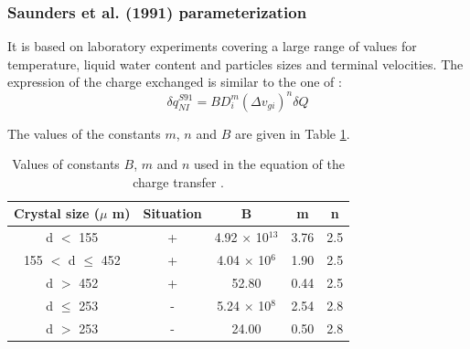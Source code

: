 \subsubsection{Saunders et al. (1991) parameterization}

It is based on laboratory experiments covering a large range of values for temperature, liquid water content and particles sizes and terminal velocities.
The expression of the charge exchanged is similar to the one of \citet{Gardiner-1985}:
\begin{equation}
  \delta q_{NI} ^{S91} = B D_i ^m (\Delta v_{gi})^n \delta Q
\end{equation}

\noindent
The values of the constants $m$, $n$ and $B$ are given in Table \ref{tab:param_saund}.
\begin{table}[h]
  \begin{center}
  \begin{tabular}{|c|c|c|c|c|}
    \hline
    Crystal size ($\mu$ m) & Situation & B & m & n \\
    \hline
    d $<$ 155            & + & 4.92 $\times$ 10$^{13}$ & 3.76 & 2.5 \\
    \hline
    155 $<$ d $\leq$ 452 & + & 4.04 $\times$ 10$^{6}$  & 1.90 & 2.5 \\
    \hline
    d $>$ 452            & + & 52.80                   & 0.44 & 2.5 \\
    \hline
    d $\leq$ 253         & - & 5.24 $\times$ 10$^{8}$  & 2.54 & 2.8 \\
    \hline
    d $>$ 253            & - & 24.00                   & 0.50 & 2.8 \\
    \hline
  \end{tabular}
  \end{center}
  \caption{\small Values of constants $B$, $m$ and $n$ used in the equation of the charge transfer \citep{Saunders-1991}.}
  \label{tab:param_saund}
\end{table}

